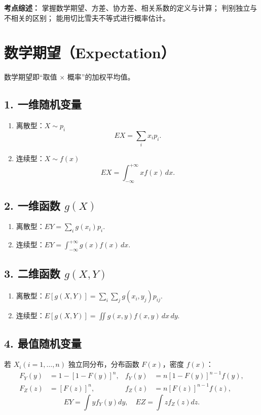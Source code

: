
\textbf{考点综述：}
掌握数学期望、方差、协方差、相关系数的定义与计算；
判别独立与不相关的区别；
能用切比雪夫不等式进行概率估计。


\section{数学期望（Expectation）}
数学期望即“取值 × 概率”的加权平均值。

\subsection*{1. 一维随机变量}
\begin{enumerate}
      \item 离散型：$X\sim p_i$
            $$EX=\sum_i x_i p_i.$$
      \item 连续型：$X\sim f(x)$
            $$EX=\int_{-\infty}^{+\infty} x f(x)\,dx.$$
\end{enumerate}

\subsection*{2. 一维函数 $g(X)$}
\begin{enumerate}
      \item 离散型：$EY=\sum_i g(x_i)p_i.$
      \item 连续型：$EY=\int_{-\infty}^{+\infty} g(x)f(x)\,dx.$
\end{enumerate}

\subsection*{3. 二维函数 $g(X,Y)$}
\begin{enumerate}
      \item 离散型：$E[g(X,Y)]=\sum_i\sum_j g(x_i,y_j)p_{ij}.$
      \item 连续型：$E[g(X,Y)]=\iint g(x,y)f(x,y)\,dx\,dy.$
\end{enumerate}

\subsection*{4. 最值随机变量}
若 $X_i(i=1,\dots,n)$ 独立同分布，分布函数 $F(x)$，密度 $f(x)$：
\begin{align*}
      F_Y(y) & =1-[1-F(y)]^n, & f_Y(y) & =n[1-F(y)]^{n-1}f(y), \\
      F_Z(z) & =[F(z)]^n,     & f_Z(z) & =n[F(z)]^{n-1}f(z),
\end{align*}
$$EY=\int yf_Y(y)dy,\quad EZ=\int zf_Z(z)dz.$$

